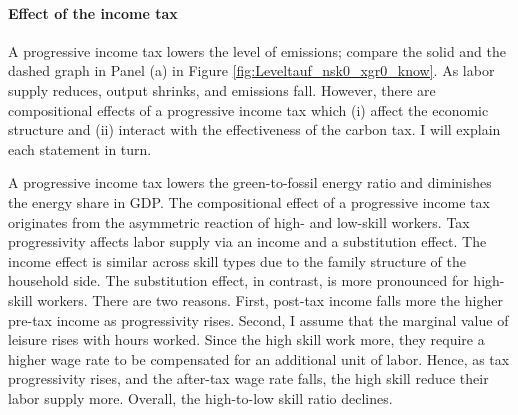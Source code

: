 \paragraph{Effect of the income tax}

A progressive income tax lowers the level of emissions; compare the solid and the dashed graph in Panel (a) in Figure \ref{fig:Leveltauf_nsk0_xgr0_know}. As labor supply reduces, output shrinks, and emissions fall. 
However, there are compositional effects of a progressive income tax which (i) affect the economic structure and (ii) interact with the effectiveness of the carbon tax. I will explain each statement in turn. 

A progressive income tax lowers the green-to-fossil energy ratio and diminishes the energy share in GDP. %
The compositional effect of a progressive income tax originates from the asymmetric reaction of high- and low-skill workers. 
Tax progressivity affects labor supply via an income and a substitution effect. 
The income effect is similar across skill types due to the family structure of the household side.
The substitution effect, in contrast, is more pronounced for high-skill workers.
There are two reasons. First, post-tax income falls more the higher pre-tax income as progressivity rises. 
Second,  I assume that the marginal value of leisure rises with hours worked. Since the high skill work more, they require a higher wage rate to be compensated for an additional unit of labor. Hence, as tax progressivity rises, and the after-tax wage rate falls, the high skill reduce their labor supply more.  %
Overall, the high-to-low skill ratio declines. 


